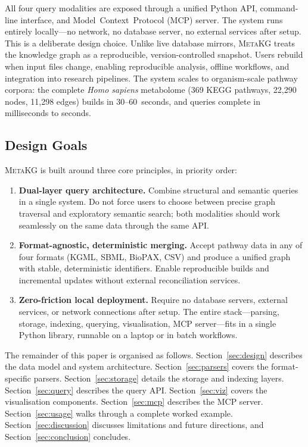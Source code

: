 \documentclass[10pt]{article}
\begin{document}
All four query modalities are exposed through a unified Python API,
command-line interface, and Model~Context~Protocol (MCP) server. The system
runs entirely locally---no network, no database server, no external services
after setup. This is a deliberate design choice. Unlike live database mirrors,
\textsc{MetaKG} treats the knowledge graph as a reproducible,
version-controlled snapshot. Users rebuild when input files change, enabling
reproducible analysis, offline workflows, and integration into research
pipelines. The system scales to organism-scale pathway corpora: the complete
\textit{Homo sapiens} metabolome (369 KEGG pathways, 22,290 nodes, 11,298
edges) builds in 30--60~seconds, and queries complete in milliseconds to
seconds.

\subsection{Design Goals}

\textsc{MetaKG} is built around three core principles, in priority order:

\begin{enumerate}[leftmargin=*, itemsep=2pt]
\item \textbf{Dual-layer query architecture.} Combine structural and semantic
  queries in a single system. Do not force users to choose between precise
  graph traversal and exploratory semantic search; both modalities should work
  seamlessly on the same data through the same API.

\item \textbf{Format-agnostic, deterministic merging.} Accept pathway data in
  any of four formats (KGML, SBML, BioPAX, CSV) and produce a unified graph
  with stable, deterministic identifiers. Enable reproducible builds and
  incremental updates without external reconciliation services.

\item \textbf{Zero-friction local deployment.} Require no database servers,
  external services, or network connections after setup. The entire
  stack---parsing, storage, indexing, querying, visualisation, MCP
  server---fits in a single Python library, runnable on a laptop or in batch
  workflows.
\end{enumerate}

The remainder of this paper is organised as follows. Section~\ref{sec:design}
describes the data model and system architecture. Section~\ref{sec:parsers}
covers the format-specific parsers. Section~\ref{sec:storage} details the
storage and indexing layers. Section~\ref{sec:query} describes the query API.
Section~\ref{sec:viz} covers the visualisation components.
Section~\ref{sec:mcp} describes the MCP server. Section~\ref{sec:usage}
walks through a complete worked example. Section~\ref{sec:discussion}
discusses limitations and future directions, and Section~\ref{sec:conclusion}
concludes.
\end{document}
